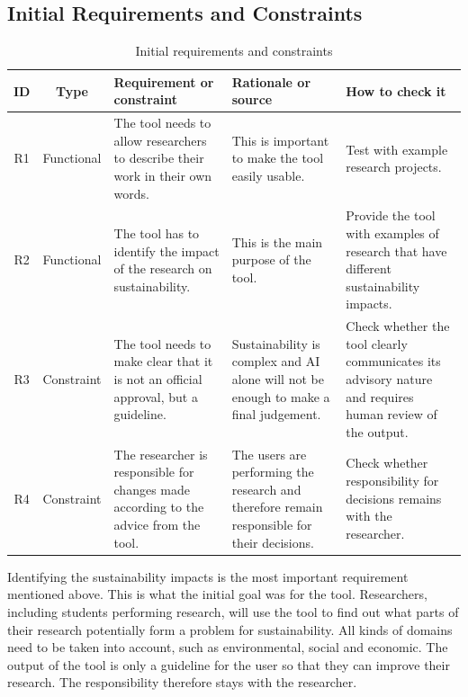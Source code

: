 \documentclass[11pt,a4paper]{article}
\begin{document}
\FloatBarrier
\subsection{Initial Requirements and Constraints}

\begin{table}[H]
\centering
\caption{Initial requirements and constraints}
\label{tab:requirements}
\begin{tabularx}{\textwidth}{|c|c|X|X|X|}
\hline
\textbf{ID} & \textbf{Type} & \textbf{Requirement or constraint} & 
\textbf{Rationale or source} & \textbf{How to check it} \\
\hline

R1 & Functional &
The tool needs to allow researchers to describe their work in their own words. &
This is important to make the tool easily usable. &
Test with example research projects. \\
\hline

R2 & Functional &
The tool has to identify the impact of the research on sustainability. &
This is the main purpose of the tool. &
Provide the tool with examples of research that have different sustainability impacts. \\
\hline

R3 & Constraint &
The tool needs to make clear that it is not an official approval, but a guideline. &
Sustainability is complex and AI alone will not be enough to make a final judgement. &
Check whether the tool clearly communicates its advisory nature and requires human review of the output. \\
\hline

R4 & Constraint &
The researcher is responsible for changes made according to the advice from the tool. &
The users are performing the research and therefore remain responsible for their decisions. &
Check whether responsibility for decisions remains with the researcher. \\
\hline

\end{tabularx}
\end{table}

Identifying the sustainability impacts is the most important requirement mentioned above. This is what the initial goal was for the tool. Researchers, including students performing research, will use the tool to find out what parts of their research potentially form a problem for sustainability. 
All kinds of domains need to be taken into account, such as environmental, social and economic. The output of the tool is only a guideline for the user so that they can improve their research. The responsibility therefore stays with the researcher. 
\end{document}
